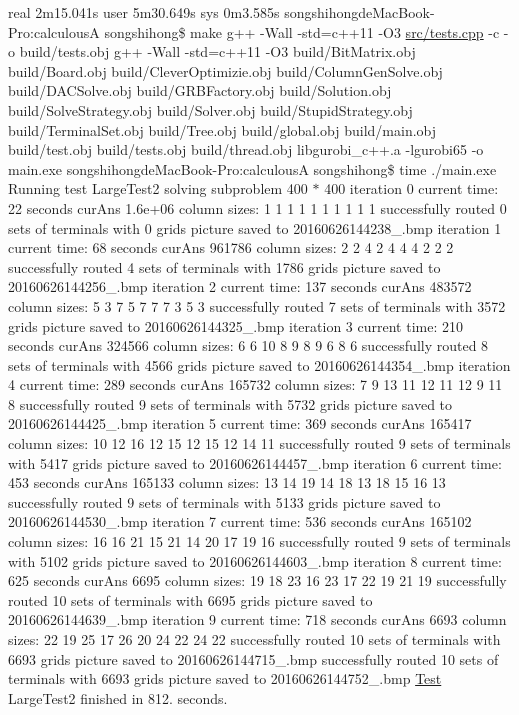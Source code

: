 real 2m15.\+041s user 5m30.\+649s sys 0m3.\+585s songshihongde\+Mac\+Book-\/\+Pro\+:calculousA songshihong\$ make g++ -\/\+Wall -\/std=c++11 -\/\+O3 \hyperlink{tests_8cpp}{src/tests.\+cpp} -\/c -\/o build/tests.\+obj g++ -\/\+Wall -\/std=c++11 -\/\+O3 build/\+Bit\+Matrix.\+obj build/\+Board.\+obj build/\+Clever\+Optimizie.\+obj build/\+Column\+Gen\+Solve.\+obj build/\+D\+A\+C\+Solve.\+obj build/\+G\+R\+B\+Factory.\+obj build/\+Solution.\+obj build/\+Solve\+Strategy.\+obj build/\+Solver.\+obj build/\+Stupid\+Strategy.\+obj build/\+Terminal\+Set.\+obj build/\+Tree.\+obj build/global.\+obj build/main.\+obj build/test.\+obj build/tests.\+obj build/thread.\+obj libgurobi\+\_\+c++.a -\/lgurobi65 -\/o main.\+exe songshihongde\+Mac\+Book-\/\+Pro\+:calculousA songshihong\$ time ./main.exe Running test Large\+Test2 solving subproblem 400 $\ast$ 400 iteration 0 current time\+: 22 seconds cur\+Ans 1.\+6e+06 column sizes\+: 1 1 1 1 1 1 1 1 1 1 successfully routed 0 sets of terminals with 0 grids picture saved to 20160626144238\+\_.\+bmp iteration 1 current time\+: 68 seconds cur\+Ans 961786 column sizes\+: 2 2 4 2 4 4 4 2 2 2 successfully routed 4 sets of terminals with 1786 grids picture saved to 20160626144256\+\_.\+bmp iteration 2 current time\+: 137 seconds cur\+Ans 483572 column sizes\+: 5 3 7 5 7 7 7 3 5 3 successfully routed 7 sets of terminals with 3572 grids picture saved to 20160626144325\+\_.\+bmp iteration 3 current time\+: 210 seconds cur\+Ans 324566 column sizes\+: 6 6 10 8 9 8 9 6 8 6 successfully routed 8 sets of terminals with 4566 grids picture saved to 20160626144354\+\_.\+bmp iteration 4 current time\+: 289 seconds cur\+Ans 165732 column sizes\+: 7 9 13 11 12 11 12 9 11 8 successfully routed 9 sets of terminals with 5732 grids picture saved to 20160626144425\+\_.\+bmp iteration 5 current time\+: 369 seconds cur\+Ans 165417 column sizes\+: 10 12 16 12 15 12 15 12 14 11 successfully routed 9 sets of terminals with 5417 grids picture saved to 20160626144457\+\_.\+bmp iteration 6 current time\+: 453 seconds cur\+Ans 165133 column sizes\+: 13 14 19 14 18 13 18 15 16 13 successfully routed 9 sets of terminals with 5133 grids picture saved to 20160626144530\+\_.\+bmp iteration 7 current time\+: 536 seconds cur\+Ans 165102 column sizes\+: 16 16 21 15 21 14 20 17 19 16 successfully routed 9 sets of terminals with 5102 grids picture saved to 20160626144603\+\_.\+bmp iteration 8 current time\+: 625 seconds cur\+Ans 6695 column sizes\+: 19 18 23 16 23 17 22 19 21 19 successfully routed 10 sets of terminals with 6695 grids picture saved to 20160626144639\+\_.\+bmp iteration 9 current time\+: 718 seconds cur\+Ans 6693 column sizes\+: 22 19 25 17 26 20 24 22 24 22 successfully routed 10 sets of terminals with 6693 grids picture saved to 20160626144715\+\_.\+bmp successfully routed 10 sets of terminals with 6693 grids picture saved to 20160626144752\+\_.\+bmp \hyperlink{classTest}{Test} Large\+Test2 finished in 812. seconds.

